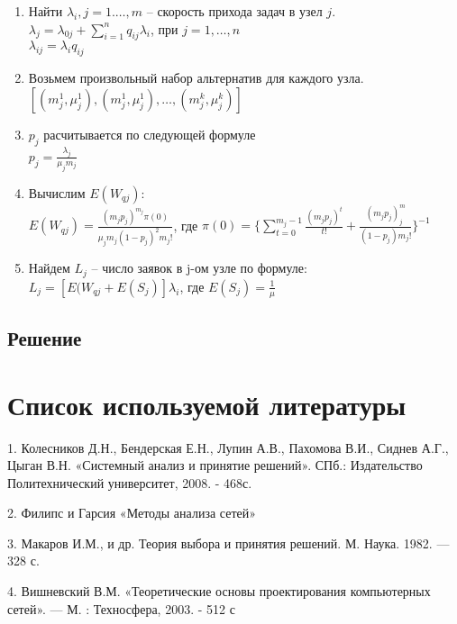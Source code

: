 \documentclass[a4paper, 12pt]{article}		%
\begin{document}
\begin{enumerate}
	\item Найти $\lambda_i, j = 1. \dots, m$ -- скорость прихода задач в узел $j$.\\
	$\lambda_j = \lambda_{0j} + \sum\limits_{i=1}^n q_{ij}\lambda_i$, при $j=1,\dots,n$\\
	$\lambda_{ij}=\lambda_i q_{ij}$
	\item Возьмем произвольный набор альтернатив для каждого узла.\\
	$[(m_j^1,\mu_j^1),(m_j^1,\mu_j^1),\dots,(m_j^k,\mu_j^k)]$
	\item $p_j$ расчитывается по следующей формуле\\
	$p_j = \frac{\lambda_j}{\mu_j m_j}$
	\item Вычислим $E(W_{qj})$:\\
	$E(W_{qj}) = \frac{(m_j p_j)^{m_j} \pi(0)}{\mu_j m_j (1-p_j)^2 m_j!}$, где
	$\pi(0) = \{\sum\limits_{t=0}^{m_j - 1} \frac{(m_j p_j)^t}{t!} + \frac{(m_j p_j) ^ m_j}{(1-p_j)m_j!}  \}^{-1}$
	\item Найдем $L_j$ -- число заявок в j-ом узле по формуле:\\
	$L_j = [E(W_{qj} + E(S_j)] \lambda_i$, где $E(S_j)= \frac{1}{\mu}$
	 
\end{enumerate}

\subsection{Решение}


%
\newpage
\section*{Список используемой литературы}

1.	Колесников Д.Н., Бендерская Е.Н., Лупин А.В., Пахомова В.И., Сиднев А.Г., Цыган В.Н. «Системный анализ и принятие решений». СПб.: Издательство Политехнический университет, 2008. - 468с.

2.  Филипс и Гарсия «Методы анализа сетей»

3.	Макаров И.М., и др. Теория выбора и принятия решений. М. Наука. 1982. — 328 с.

4.	Вишневский В.М. «Теоретические основы проектирования компьютерных сетей». — М. : Техносфера, 2003. - 512 с

\end{document}
